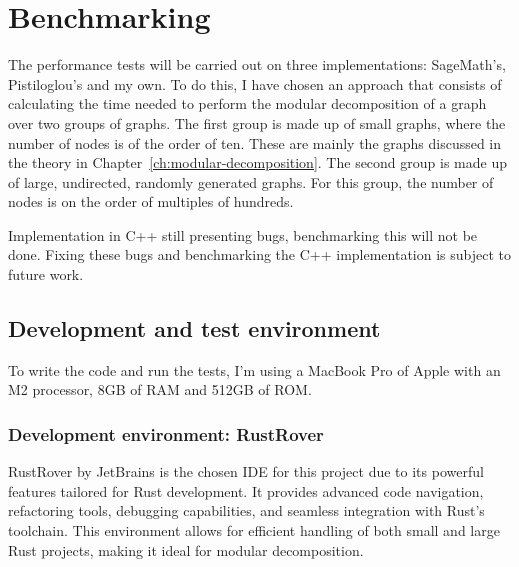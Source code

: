 

\chapter{Benchmarking}\label{ch:benchmarking}

The performance tests will be carried out on three implementations: SageMath's, Pistiloglou's and my own.
To do this, I have chosen an approach that consists of calculating the time needed to perform the modular decomposition of a graph over two groups of graphs.
The first group is made up of small graphs, where the number of nodes is of the order of ten.
These are mainly the graphs discussed in the theory in Chapter~\ref{ch:modular-decomposition}.
The second group is made up of large, undirected, randomly generated graphs.
For this group, the number of nodes is on the order of multiples of hundreds.

Implementation in C++ still presenting bugs, benchmarking this will not be done.
Fixing these bugs and benchmarking the C++ implementation is subject to future work.

\section{Development and test environment}\label{sec:development-and-test-environment}

To write the code and run the tests, I'm using a MacBook Pro of Apple with an M2 processor, 8GB of RAM and 512GB of ROM\cite{macbookprom2}.

\subsection{Development environment: RustRover}\label{subsec:development-environment-rustrover}

RustRover\cite{rustrover} by JetBrains\cite{jetbrains} is the chosen IDE for this project due to its powerful features tailored for Rust development.
It provides advanced code navigation, refactoring tools, debugging capabilities, and seamless integration with Rust's toolchain.
This environment allows for efficient handling of both small and large Rust projects, making it ideal for modular decomposition.

